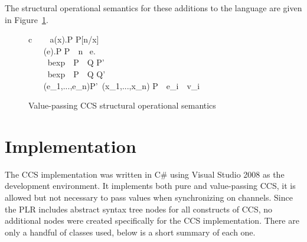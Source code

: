 	The structural operational semantics for these additions to the language are given in Figure~\ref{fig:ccs_value_pass_sos}.	

\begin{figure}[t]
	
	\begin{ARRAY}{c}
		\ \ \ \Inference{                              }
	                            {a(x).P  P[n/x]} \vspace{10pt}\\
	\ \ \ \Inference{                              }
	                            {(e).P  P}\ \ n \ e. \vspace{10pt}\\
		\ \ \ 
	                            {\ bexp\ \ P\  \ Q \infarrow{\alpha} P'}\ \  \vspace{10pt}\\
		\ \ \ 
	                            {\ bexp\ \ P\  \ Q \infarrow{\alpha} Q'}\ \  \vspace{10pt}\\

		\ \ \ 
	 {(e_1,...,e_n)\infarrow{\alpha}P'}\ (x_1,...,x_n)  P\ \ e_i\ \ v_i\vspace{10pt}\\
	                            
	\end{ARRAY}
	\caption{Value-passing CCS structural operational semantics}\label{fig:ccs_value_pass_sos}	
\end{figure}


\section{Implementation}

	The CCS implementation was written in C\# using Visual Studio 2008 as the 
	development environment. It implements both pure and value-passing CCS, it 
	is allowed but not necessary to pass values when synchronizing on channels. 
	Since the PLR includes abstract syntax tree nodes for all constructs of CCS, 
	no additional nodes were created specifically for the CCS implementation. 
	There are only a handful of classes used, below is a short summary of each 
	one.

